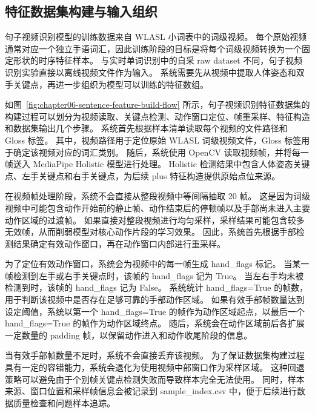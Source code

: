 
\subsection{特征数据集构建与输入组织}

句子视频识别模型的训练数据来自 WLASL 小词表中的词级视频。
每个原始视频通常对应一个独立手语词汇，因此训练阶段的目标是将每个词级视频转换为一个固定形状的时序特征样本。
与实时单词识别中的自采 raw dataset 不同，句子视频识别实验直接以离线视频文件作为输入。
系统需要先从视频中提取人体姿态和双手关键点，再进一步组织为模型可以训练的特征数组。


如图~\ref{fig:chapter06-sentence-feature-build-flow} 所示，句子视频识别特征数据集的构建过程可以划分为视频读取、关键点检测、动作窗口定位、帧重采样、特征构造和数据集输出几个步骤。
系统首先根据样本清单读取每个视频的文件路径和 Gloss 标签。
其中，视频路径用于定位原始 WLASL 词级视频文件，Gloss 标签用于确定该视频对应的词汇类别。
随后，系统使用 OpenCV 读取视频帧，并将每一帧送入 MediaPipe Holistic 模型进行处理。
Holistic 检测结果中包含人体姿态关键点、左手关键点和右手关键点，为后续 plus 特征构造提供原始点位来源。

在视频帧处理阶段，系统不会直接从整段视频中等间隔抽取 20 帧。
这是因为词级视频中可能包含动作开始前的静止帧、动作结束后的停顿帧以及手部尚未进入主要动作区域的过渡帧。
如果直接对整段视频进行均匀采样，采样结果可能包含较多无效帧，从而削弱模型对核心动作片段的学习效果。
因此，系统首先根据手部检测结果确定有效动作窗口，再在动作窗口内部进行重采样。

为了定位有效动作窗口，系统会为视频中的每一帧生成 hand\_flags 标记。
当某一帧检测到左手或右手关键点时，该帧的 hand\_flags 记为 True。
当左右手均未被检测到时，该帧的 hand\_flags 记为 False。
系统统计 hand\_flags=True 的帧数，用于判断该视频中是否存在足够可靠的手部动作区域。
如果有效手部帧数量达到设定阈值，系统以第一个 hand\_flags=True 的帧作为动作区域起点，以最后一个 hand\_flags=True 的帧作为动作区域终点。
随后，系统会在动作区域前后各扩展一定数量的 padding 帧，以保留动作进入和动作收尾阶段的信息。

当有效手部帧数量不足时，系统不会直接丢弃该视频。
为了保证数据集构建过程具有一定的容错能力，系统会退化为使用视频中部窗口作为采样区域。
这种回退策略可以避免由于个别帧关键点检测失败而导致样本完全无法使用。
同时，样本来源、窗口位置和采样帧信息会被记录到 sample\_index.csv 中，便于后续进行数据质量检查和问题样本追踪。

